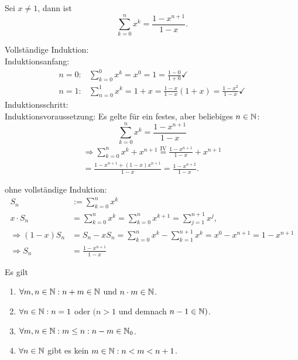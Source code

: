 \documentclass[../ana1.tex]{subfiles}
\begin{document}
\begin{satz}
	Sei \(x\neq 1\), dann ist \[\sum_{k=0}^{n}x^k = \frac{1-x^{n+1}}{1-x}.\]
\end{satz}
\begin{bew}
	Vollständige Induktion:\\
	Induktionsanfang:
	\begin{equation*}
		\begin{aligned}
			n=0: & \sum_{k=0}^{0} x^k = x^0 = 1 = \frac{1-0}{1+0}\checkmark \\
			n=1: & \sum_{n=0}^{1} x^k = 1+x = \frac{1-x}{1-x} (1+x) = \frac{1-x^2}{1-x}\checkmark
		\end{aligned}
	\end{equation*}
	Induktionsschritt:\\
	Induktionsvoraussetzung: Es gelte für ein festes, aber beliebiges \(n\in\mathbb{N} \): 
	\[ \sum_{k=0}^{n} x^k = \frac{1-x^{n+1}}{1-x}\]
	\begin{equation}
		\begin{aligned}
			\Rightarrow \sum_{k=0}^{n} x^k + x^{n+1} \overset{\text{IV}}{=} \frac{1-x^{n+1}}{1-x} + x^{n+1} \\
			= \frac{1-x^{n+1} + (1-x)x^{n+1}}{1-x} = \frac{1-x^{n+2}}{1-x}.
		\end{aligned}
	\end{equation}
\end{bew}
\begin{bew} ohne vollständige Induktion:
	\[\begin{aligned}
		S_n                  & := \sum_{k=0}^{n} x^k                                                                 \\
		x\cdot S_n           & = \sum_{k=0}^{n} x^k = \sum_{k=0}^{n} x^{k+1} = \sum_{j=1}^{n+1} x^j,                 \\
		\Rightarrow (1-x)S_n & = S_n - x S_n = \sum_{k=0}^{n} x^k - \sum_{k=1}^{n+1} x^k = x^0 - x^{n+1} = 1-x^{n+1} \\
		\Rightarrow S_n      & = \frac{1-x^{n+1}}{1-x}
	\end{aligned}\]
\end{bew}
\begin{satz}
	Es gilt
	\begin{enumerate}
		\item \( \forall m,n \in \mathbb{N}: n+m \in \mathbb{N} \) und \(n\cdot m \in \mathbb{N} \).
		\item \( \forall n\in\mathbb{N}: n=1\) oder \((n>1\) und demnach \(n-1 \in \mathbb{N})\).
		\item \( \forall m,n\in\mathbb{N}:m\leq n:n-m\in\mathbb{N}_0\).
		\item \( \forall n\in\mathbb{N} \) gibt es kein \(m\in\mathbb{N}: n<m<n+1\).
	\end{enumerate}
\end{satz}
\end{document}
